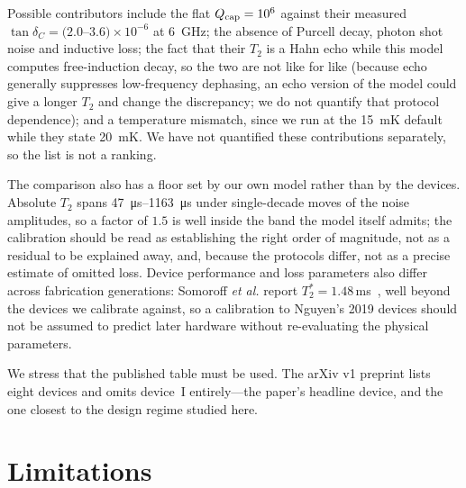 \documentclass{SciPost}
\begin{document}
Possible contributors include the flat $Q_{\rm cap} = 10^6$ against their measured
$\tan\delta_C = (2.0$--$3.6)\times10^{-6}$ at \SI{6}{\giga\hertz}; the absence of Purcell
decay, photon shot noise and inductive loss; the fact that their $T_2$ is a Hahn echo while this model computes free-induction decay, so the two are not like for like (because echo generally suppresses low-frequency dephasing, an
echo version of the model could give a longer $T_2$ and change the discrepancy; we do not quantify
that protocol dependence); and a temperature mismatch, since we run at the \SI{15}{\milli\kelvin}
default while they state \SI{20}{\milli\kelvin}. We have not quantified these contributions
separately, so the list is not a ranking.

The comparison also has a floor set by our own model rather than by the devices. Absolute
$T_2$ spans \SIrange{47}{1163}{\micro\second} under single-decade moves of the noise amplitudes, so
a factor of $1.5$ is well inside the band the model itself admits; the calibration should be read as establishing the right order of magnitude, not as a residual to be
explained away, and, because the protocols differ, not as a precise estimate of omitted loss. Device performance and loss parameters also differ across fabrication generations: Somoroff
\emph{et al.} report $T_2^* = 1.48$\,ms~\cite{somoroff2023}, well beyond the devices we calibrate
against, so a calibration to Nguyen's 2019 devices should not be assumed to predict later hardware
without re-evaluating the physical parameters.

We stress that the published table must be used. The arXiv v1 preprint lists eight devices
and omits device~I entirely---the paper's headline device, and the one closest to the design
regime studied here.

\section{Limitations}
\label{sec:limitations}
\end{document}
